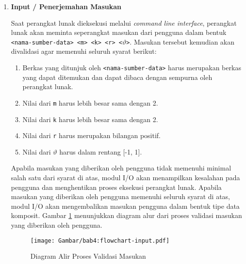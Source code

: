 \begin{enumerate}
    \item \textbf{Input / Penerjemahan Masukan}
    
    Saat perangkat lunak dieksekusi melalui \textit{command line interface}, perangkat lunak akan meminta seperangkat masukan dari pengguna dalam bentuk \texttt{<nama-sumber-data> <m> <k> <r> <$\vartheta$>}. Masukan tersebut kemudian akan divalidasi agar memenuhi seluruh syarat berikut:
    
    \begin{enumerate}
        \item Berkas yang ditunjuk oleh \texttt{<nama-sumber-data>} harus merupakan berkas yang dapat ditemukan dan dapat dibaca dengan sempurna oleh perangkat lunak.
        \item Nilai dari \texttt{m} harus lebih besar sama dengan 2.
        \item Nilai dari \texttt{k} harus lebih besar sama dengan 2.
        \item Nilai dari \texttt{r} harus merupakan bilangan positif.
        \item Nilai dari $\vartheta$ harus dalam rentang [-1, 1].
    \end{enumerate}
    
    Apabila masukan yang diberikan oleh pengguna tidak memenuhi minimal salah satu dari syarat di atas, modul I/O akan menampilkan kesalahan pada pengguna dan menghentikan proses eksekusi perangkat lunak. Apabila masukan yang diberikan oleh pengguna memenuhi seluruh syarat di atas, modul I/O akan mengembalikan masukan pengguna dalam bentuk tipe data komposit. Gambar \ref{bab4:flowchart-input} menunjukkan diagram alur dari proses validasi masukan yang diberikan oleh pengguna.
    
    \iffalse
    
    Untuk mempermudah proses implementasi perangkat lunak, fungsionalitas ini akan diimplementasikan menggunakan bantuan pustaka C++ yang bernama \texttt{argparse}. Pustaka \texttt{argparse} dipilih karena memiliki kemampuan untuk mempermudah konversi tipe data menjadi tipe data yang sesuai serta menyediakan fitur untuk menampilkan bantuan penggunaan perangkat lunak dalam bentuk \textit{command line interface} pada pengguna.
    
    \fi
    
    \begin{figure}[t]
        \centering
        \texttt{[image: Gambar/bab4:flowchart-input.pdf]}
        \caption{Diagram Alir Proses Validasi Masukan}
        \label{bab4:flowchart-input}
    \end{figure}
    

\end{enumerate}
